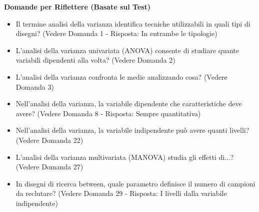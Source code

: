 \documentclass[12pt, a4paper]{article}
\newenvironment{reflectionbox}{%
    \medskip
    \begin{framed}\par\noindent
    \textbf{\color{boxtitlecolor}Domande per Riflettere (Basate sul Test)} \par
    \begin{itemize}[leftmargin=*, label=$\blacktriangleright$]
}{%
    \end{itemize}\par
    \end{framed}
    \medskip
}
\begin{document}
\begin{reflectionbox}
    \item Il termine analisi della varianza identifica tecniche utilizzabili in quali tipi di disegni? (Vedere Domanda 1 - Risposta: In entrambe le tipologie)
    \item L'analisi della varianza univariata (ANOVA) consente di studiare quante variabili dipendenti alla volta? (Vedere Domanda 2)
    \item L'analisi della varianza confronta le medie analizzando cosa? (Vedere Domanda 3)
    \item Nell'analisi della varianza, la variabile dipendente che caratteristiche deve avere? (Vedere Domanda 8 - Risposta: Sempre quantitativa)
    \item Nell'analisi della varianza, la variabile indipendente può avere quanti livelli? (Vedere Domanda 22)
    \item L'analisi della varianza multivariata (MANOVA) studia gli effetti di...? (Vedere Domanda 27)
    \item In disegni di ricerca between, quale parametro definisce il numero di campioni da reclutare? (Vedere Domanda 29 - Risposta: I livelli dalla variabile indipendente)
\end{reflectionbox}
\end{document}
